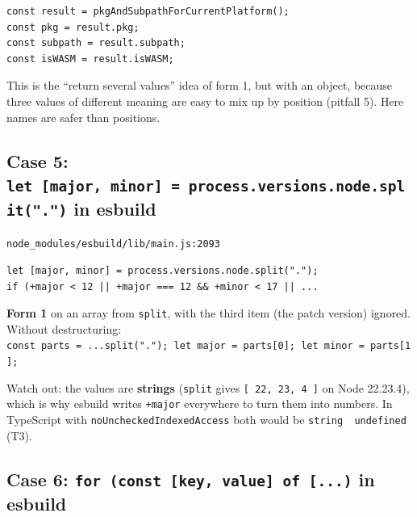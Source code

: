 \documentclass[
  10pt,
]{article}
\begin{document}
\begin{verbatim}
const result = pkgAndSubpathForCurrentPlatform();
const pkg = result.pkg;
const subpath = result.subpath;
const isWASM = result.isWASM;
\end{verbatim}

This is the ``return several values'' idea of form 1, but with an
object, because three values of different meaning are easy to mix up by
position (pitfall 5). Here names are safer than positions.

\hypertarget{case-5-let-major-minor--processversionsnodesplit-in-esbuild}{%
\subsection{\texorpdfstring{Case 5:
\texttt{let\ {[}major,\ minor{]\allowbreak{}}\ =\ process.\allowbreak{}versions.\allowbreak{}node.\allowbreak{}split(".\allowbreak{}")}
in
esbuild}{Case 5:  in esbuild}}\label{case-5-let-major-minor--processversionsnodesplit-in-esbuild}}

\texttt{node\_modules/\allowbreak{}esbuild/\allowbreak{}lib/\allowbreak{}main.\allowbreak{}js:2093}

\begin{verbatim}
let [major, minor] = process.versions.node.split(".");
if (+major < 12 || +major === 12 && +minor < 17 || ...
\end{verbatim}

\textbf{Form 1} on an array from \texttt{split}, with the third item
(the patch version) ignored. Without destructuring:
\texttt{const\ parts\ =\ .\allowbreak{}.\allowbreak{}.\allowbreak{}split(".\allowbreak{}");\ let\ major\ =\ parts{[}0{]\allowbreak{}};\ let\ minor\ =\ parts{[}1{]\allowbreak{}};}

Watch out: the values are \textbf{strings} (\texttt{split} gives
\texttt{{[}\ \allowbreak{}\textquotesingle{}22\allowbreak{}\textquotesingle{},\ \allowbreak{}\textquotesingle{}23\allowbreak{}\textquotesingle{},\ \allowbreak{}\textquotesingle{}4\allowbreak{}\textquotesingle{}\ {]\allowbreak{}}}
on Node 22.23.4), which is why esbuild writes \texttt{+major} everywhere
to turn them into numbers. In TypeScript with
\texttt{noUncheckedIndexedAccess} both would be
\texttt{string\ \textbar{}\ undefined} (T3).

\hypertarget{case-6-for-const-key-value-of--in-esbuild}{%
\subsection{\texorpdfstring{Case 6:
\texttt{for\ (const\ {[}key,\ value{]\allowbreak{}}\ of\ {[}.\allowbreak{}.\allowbreak{}.\allowbreak{}{]\allowbreak{}})}
in
esbuild}{Case 6:  in esbuild}}\label{case-6-for-const-key-value-of--in-esbuild}}
\end{document}
